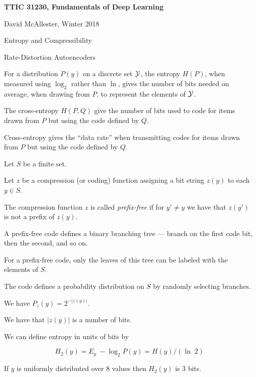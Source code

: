 





{\Huge

  \centerline{\bf TTIC 31230, Fundamentals of Deep Learning}
  \bigskip
  \centerline{David McAllester, Winter 2018}
  \vfill
  \centerline{Entropy and Compressibility}
  \vfill
  \centerline{Rate-Distortion Autoencoders}



For a distribution $P(y)$ on a discrete set ${\cal Y}$, the entropy $H(P)$, when measured using $\log_2$ rather than $\ln$, gives the number of bits needed
on average, when drawing from $P$, to represent the elements of ${\cal Y}$.

\vfill
The cross-entropy $H(P,Q)$ give the number of bits used to code for items drawn from $P$ but using the code defined by $Q$.

\vfill
Cross-entropy gives the ``data rate'' when transmitting codes for items drawn from $P$ but using the code defined by $Q$.


Let $S$ be a finite set.

\vfill
Let $z$ be a compression (or coding) function  assigning a bit string $z(y)$ to each $y \in S$.

\vfill
The compression function $z$ is called {\em prefix-free} if for $y' \not = y$ we have that $z(y')$ is not a prefix of $z(y)$.


A prefix-free code defines a binary branching tree --- branch on the first code bit, then the second, and so on.

\vfill
For a prefix-free code, only the leaves of this tree can be labeled with the elements of $S$.

\vfill
The code defines a probability distribution on $S$ by randomly selecting branches.

\vfill
We have $P_z(y) = 2^{-|z(y)|}$.


We have that $|z(y)|$ is a number of bits.

\vfill
We can define entropy in units of bits by

\vfill
$$H_2(y) = E_y\; - \log_2 P(y) = H(y)/(\ln \;2)$$

\vfill
If $y$ is uniformly distributed over 8 values then $H_2(y)$ is 3 bits.

}
